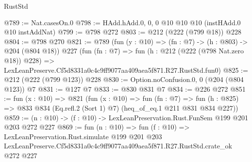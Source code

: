 \begin{lexlean}{RustStd}
\begin{coremodule}
@789 := Nat.casesOn.{0}
@798 := HAdd.hAdd.{0, 0, 0} @10 @10 @10 (instHAdd.{0} @10 instAddNat)
@799 := @798 @272
@803 := @212 (@222 (@799 @18)) @228
@804 := @798 @270
@821 := @789
    (fun (y : @10) => (fn : @7) -> (h : @803) -> @204 (@804 @18))
    @227
    (fun (fn : @7) =>
    fun (h : @212 (@222 (@798 Nat.zero @18)) @228) =>
    LexLeanPreserve.Cf5d8331a0c4c9ff9077aa409aea5f871.R27.RustStd.fun0)
@825 := @212 (@222 (@799 @123)) @228
@830 := Option.noConfusion.{0, 0} (@204 (@804 @123)) @7
@831 := @127 @7
@833 := @830 @831 @7
@834 := @226 @272
@851 := fun (x : @10) =>
  @821
    (fun (x : @10) =>
    fun (fn : @7) =>
    fun (h : @825) => @833 @834 (Eq.refl.{2} (Sort 1) @7) (heq_of_eq.{1} @211 @831 @834 @227))
@859 := (n : @10) -> (f : @10) -> LexLeanPreservation.Rust.FunSem @199 @201 @203 @272 @227
@869 := fun (n : @10) =>
  fun (f : @10) =>
  LexLeanPreservation.Rust.simulate
    @199
    @201
    @203
    LexLeanPreserve.Cf5d8331a0c4c9ff9077aa409aea5f871.R27.RustStd.crate_ok
    @272
    @227
\end{coremodule}
\end{lexlean}
